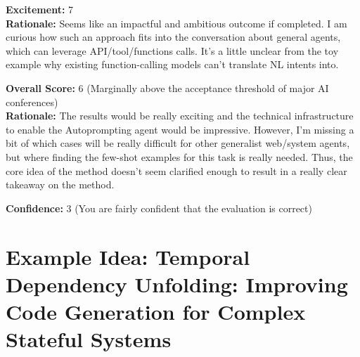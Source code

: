 \begin{tcolorbox}[colback=green!10!white, colframe=green!80!black, title=\textbf{Reviewer 2}]
\vspace{10pt}

\textbf{Excitement:} 7\\
\textbf{Rationale:} Seems like an impactful and ambitious outcome if completed. I am curious how such an approach fits into the conversation about general agents, which can leverage API/tool/functions calls. It's a little unclear from the toy example why existing function-calling models can't translate NL intents into.

\vspace{10pt}

\textbf{Overall Score:} 6 (Marginally above the acceptance threshold of major AI conferences)\\
\textbf{Rationale:} The results would be really exciting and the technical infrastructure to enable the Autoprompting agent would be impressive. However, I'm missing a bit of which cases will be really difficult for other generalist web/system agents, but where finding the few-shot examples for this task is really needed. Thus, the core idea of the method doesn't seem clarified enough to result in a really clear takeaway on the method.

\vspace{10pt}

\textbf{Confidence:} 3 (You are fairly confident that the evaluation is correct)
\end{tcolorbox}




\newpage 



\section{Example Idea: Temporal Dependency Unfolding: Improving Code Generation for Complex Stateful Systems }
\label{sec:example_8}

